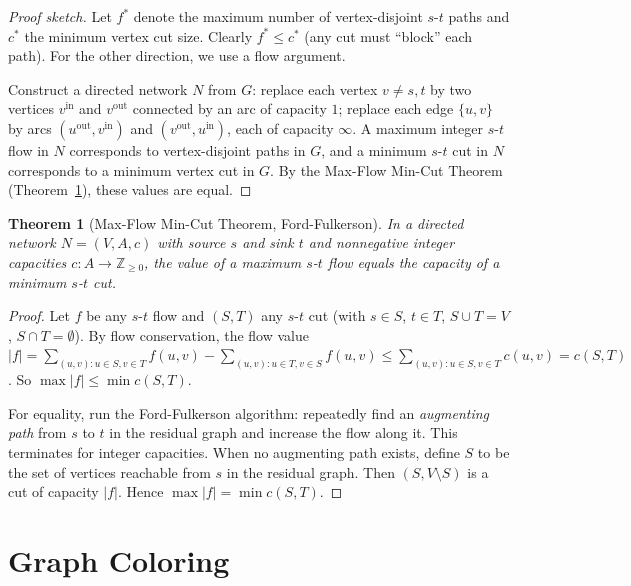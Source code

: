 \documentclass[12pt,a4paper]{amsart}
\newtheorem{theorem}{Theorem}[section]
\theoremstyle{definition}
\theoremstyle{remark}
\newcommand{\Z}{\mathbb{Z}}
\begin{document}
\begin{proof}[Proof sketch]
Let $f^*$ denote the maximum number of vertex-disjoint $s$-$t$ paths and
$c^*$ the minimum vertex cut size. Clearly $f^* \le c^*$ (any cut must
``block'' each path). For the other direction, we use a flow argument.

Construct a directed network $N$ from $G$: replace each vertex $v \ne s, t$
by two vertices $v^{\text{in}}$ and $v^{\text{out}}$ connected by an arc of
capacity $1$; replace each edge $\{u,v\}$ by arcs $(u^{\text{out}}, v^{\text{in}})$
and $(v^{\text{out}}, u^{\text{in}})$, each of capacity $\infty$. A maximum
integer $s$-$t$ flow in $N$ corresponds to vertex-disjoint paths in $G$,
and a minimum $s$-$t$ cut in $N$ corresponds to a minimum vertex cut in $G$.
By the Max-Flow Min-Cut Theorem (Theorem~\ref{thm:maxflow}), these values
are equal.
\end{proof}

\begin{theorem}[Max-Flow Min-Cut Theorem, Ford-Fulkerson]
\label{thm:maxflow}
In a directed network $N = (V, A, c)$ with source $s$ and sink $t$ and
nonnegative integer capacities $c: A \to \Z_{\ge 0}$, the value of a maximum
$s$-$t$ flow equals the capacity of a minimum $s$-$t$ cut.
\end{theorem}

\begin{proof}
Let $f$ be any $s$-$t$ flow and $(S, T)$ any $s$-$t$ cut (with $s \in S$,
$t \in T$, $S \cup T = V$, $S \cap T = \emptyset$). By flow conservation,
the flow value $|f| = \sum_{(u,v): u \in S, v \in T} f(u,v) - \sum_{(u,v): u \in T, v \in S} f(u,v)
\le \sum_{(u,v): u \in S, v \in T} c(u,v) = c(S,T)$.
So $\max |f| \le \min c(S,T)$.

For equality, run the Ford-Fulkerson algorithm: repeatedly find an
\emph{augmenting path} from $s$ to $t$ in the residual graph and increase
the flow along it. This terminates for integer capacities. When no augmenting
path exists, define $S$ to be the set of vertices reachable from $s$ in the
residual graph. Then $(S, V \setminus S)$ is a cut of capacity $|f|$.
Hence $\max |f| = \min c(S,T)$.
\end{proof}

\section{Graph Coloring}
\label{sec:coloring}
\end{document}
